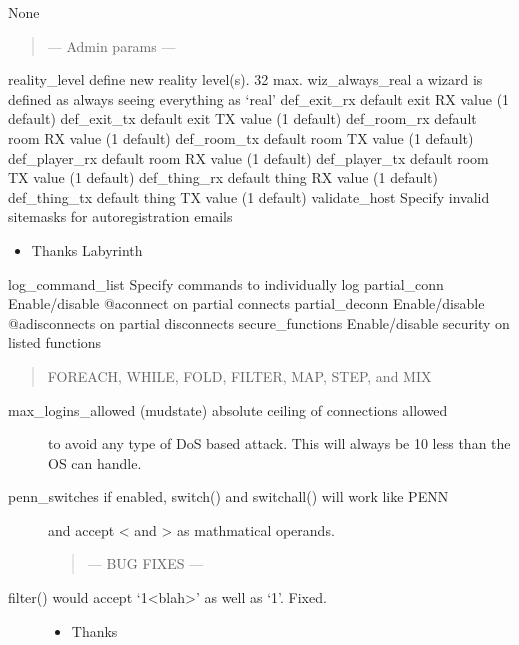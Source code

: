 \documentclass[letterpaper,10pt,english]{sphinxmanual}
\begin{document}
\sphinxAtStartPar
None
\begin{quote}

\sphinxAtStartPar
— Admin params —
\end{quote}

\sphinxAtStartPar
reality\_level     \sphinxhyphen{} define new reality level(s).  32 max.
wiz\_always\_real   \sphinxhyphen{} a wizard is defined as always seeing everything as ‘real’
def\_exit\_rx       \sphinxhyphen{} default exit RX value (1 default)
def\_exit\_tx       \sphinxhyphen{} default exit TX value (1 default)
def\_room\_rx       \sphinxhyphen{} default room RX value (1 default)
def\_room\_tx       \sphinxhyphen{} default room TX value (1 default)
def\_player\_rx     \sphinxhyphen{} default room RX value (1 default)
def\_player\_tx     \sphinxhyphen{} default room TX value (1 default)
def\_thing\_rx      \sphinxhyphen{} default thing RX value (1 default)
def\_thing\_tx      \sphinxhyphen{} default thing TX value (1 default)
validate\_host     \sphinxhyphen{} Specify invalid site\sphinxhyphen{}masks for autoregistration emails
\begin{itemize}
\item {} 
\sphinxAtStartPar
Thanks  Labyrinth

\end{itemize}

\sphinxAtStartPar
log\_command\_list  \sphinxhyphen{} Specify commands to individually log
partial\_conn      \sphinxhyphen{} Enable/disable @aconnect on partial connects
partial\_deconn    \sphinxhyphen{} Enable/disable @adisconnects on partial disconnects
secure\_functions  \sphinxhyphen{} Enable/disable security on listed functions
\begin{quote}

\sphinxAtStartPar
FOREACH, WHILE, FOLD, FILTER, MAP, STEP, and MIX
\end{quote}
\begin{description}
\item[{max\_logins\_allowed (mudstate) \sphinxhyphen{} absolute ceiling of connections allowed}] \leavevmode
\sphinxAtStartPar
to avoid any type of DoS based attack.  This will always
be 10 less than the OS can handle.

\item[{penn\_switches     \sphinxhyphen{} if enabled, switch() and switchall() will work like PENN}] \leavevmode
\sphinxAtStartPar
and accept \textless{} and \textgreater{} as mathmatical operands.
\begin{quote}

\sphinxAtStartPar
— BUG FIXES —
\end{quote}

\item[{filter() would accept ‘1\textless{}blah\textgreater{}’ as well as ‘1’.  \sphinxhyphen{} Fixed.}] \leavevmode\begin{itemize}
\item {} 
\sphinxAtStartPar
Thanks 

\end{itemize}

\end{description}
\end{document}
